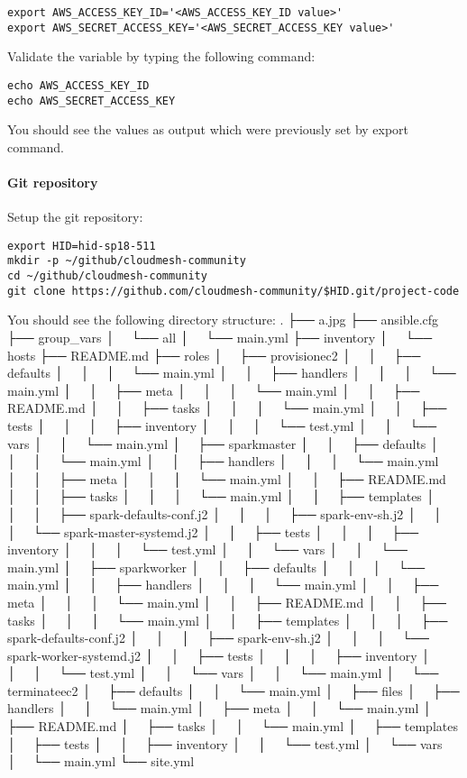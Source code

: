 \begin{verbatim}
export AWS_ACCESS_KEY_ID='<AWS_ACCESS_KEY_ID value>'
export AWS_SECRET_ACCESS_KEY='<AWS_SECRET_ACCESS_KEY value>'
\end{verbatim}

Validate the variable by typing the following command:
\begin{verbatim}
echo AWS_ACCESS_KEY_ID
echo AWS_SECRET_ACCESS_KEY
\end{verbatim}

You should see the values as output which were previously set by export command.

\paragraph{Git repository}

Setup the git repository:

\begin{verbatim}
export HID=hid-sp18-511
mkdir -p ~/github/cloudmesh-community
cd ~/github/cloudmesh-community
git clone https://github.com/cloudmesh-community/$HID.git/project-code
\end{verbatim}

You should see the following directory structure:
.
├── a.jpg
├── ansible.cfg
├── group_vars
│   └── all
│       └── main.yml
├── inventory
│   └── hosts
├── README.md
├── roles
│   ├── provisionec2
│   │   ├── defaults
│   │   │   └── main.yml
│   │   ├── handlers
│   │   │   └── main.yml
│   │   ├── meta
│   │   │   └── main.yml
│   │   ├── README.md
│   │   ├── tasks
│   │   │   └── main.yml
│   │   ├── tests
│   │   │   ├── inventory
│   │   │   └── test.yml
│   │   └── vars
│   │       └── main.yml
│   ├── sparkmaster
│   │   ├── defaults
│   │   │   └── main.yml
│   │   ├── handlers
│   │   │   └── main.yml
│   │   ├── meta
│   │   │   └── main.yml
│   │   ├── README.md
│   │   ├── tasks
│   │   │   └── main.yml
│   │   ├── templates
│   │   │   ├── spark-defaults-conf.j2
│   │   │   ├── spark-env-sh.j2
│   │   │   └── spark-master-systemd.j2
│   │   ├── tests
│   │   │   ├── inventory
│   │   │   └── test.yml
│   │   └── vars
│   │       └── main.yml
│   ├── sparkworker
│   │   ├── defaults
│   │   │   └── main.yml
│   │   ├── handlers
│   │   │   └── main.yml
│   │   ├── meta
│   │   │   └── main.yml
│   │   ├── README.md
│   │   ├── tasks
│   │   │   └── main.yml
│   │   ├── templates
│   │   │   ├── spark-defaults-conf.j2
│   │   │   ├── spark-env-sh.j2
│   │   │   └── spark-worker-systemd.j2
│   │   ├── tests
│   │   │   ├── inventory
│   │   │   └── test.yml
│   │   └── vars
│   │       └── main.yml
│   └── terminateec2
│       ├── defaults
│       │   └── main.yml
│       ├── files
│       ├── handlers
│       │   └── main.yml
│       ├── meta
│       │   └── main.yml
│       ├── README.md
│       ├── tasks
│       │   └── main.yml
│       ├── templates
│       ├── tests
│       │   ├── inventory
│       │   └── test.yml
│       └── vars
│           └── main.yml
└── site.yml

